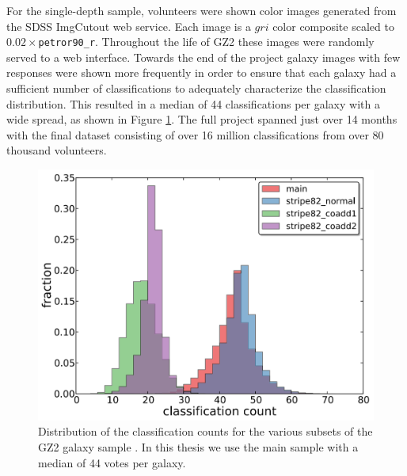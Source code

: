 For the single-depth sample, volunteers were shown color images generated from the SDSS ImgCutout web service. Each image is a $gri$ color composite scaled to $0.02\times$\texttt{petror90\_r}. Throughout the life of GZ2 these images were randomly served to a web interface. Towards the end of the project galaxy images with few responses were shown more frequently in order to ensure that each galaxy had a sufficient number of classifications to adequately characterize the classification distribution. This resulted in a median of 44 classifications per galaxy with a wide spread, as shown in Figure \ref{fig: gz2 classifications}. The full project spanned just over 14 months with the final dataset consisting of over 16 million classifications from over 80 thousand volunteers. 
 
\begin{figure}[h!]
\centering
\includegraphics[width=5in]{Figures/GZ2_classification_count.png}
\caption[Galaxy Zoo 2 classification count distributions]{Distribution of the classification counts for the various subsets of the GZ2 galaxy sample \citep[credit:][]{Willett2013}. In this thesis we use the main sample with a median of 44 votes per galaxy.}
\label{fig: gz2 classifications}
\end{figure}

